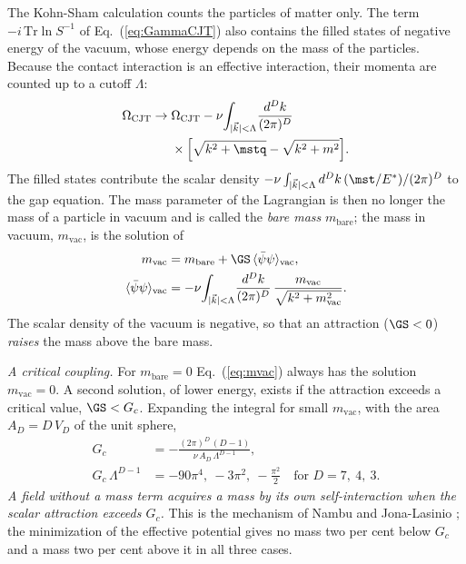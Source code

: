 The Kohn-Sham calculation counts the particles of matter only. The term
$-i\,\mathrm{Tr}\ln S^{-1}$ of Eq.~(\ref{eq:GammaCJT}) also contains the filled states of negative
energy of the vacuum, whose energy depends on the mass of the particles. Because the contact
interaction is an effective interaction, their momenta are counted up to a cutoff $\Lambda$:
\begin{equation}
\begin{aligned}
\Omega_{\mathrm{CJT}}\to{}&\Omega_{\mathrm{CJT}}-\nu\!\int_{|\vec k|<\Lambda}\!\frac{d^{D}k}{(2\pi)^{D}}\\
&\times\Big[\sqrt{k^{2}+\mstq}-\sqrt{k^{2}+m^{2}}\Big].
\end{aligned}
\label{eq:sea}
\end{equation}
The filled states contribute the scalar density
$-\nu\int_{|\vec k|<\Lambda}d^{D}k\,(\mst/E^{*})/(2\pi)^{D}$ to the gap equation. The mass parameter
of the Lagrangian is then no longer the mass of a particle in vacuum and is called the \emph{bare
mass} $m_{\mathrm{bare}}$; the mass in vacuum, $m_{\mathrm{vac}}$, is the solution of
\begin{equation}
\begin{aligned}
m_{\mathrm{vac}}&=m_{\mathrm{bare}}+\GS\,\langle\bar\psi\psi\rangle_{\mathrm{vac}},\\
\langle\bar\psi\psi\rangle_{\mathrm{vac}}&=-\nu\!\int_{|\vec k|<\Lambda}\!\frac{d^{D}k}{(2\pi)^{D}}\,\frac{m_{\mathrm{vac}}}{\sqrt{k^{2}+m_{\mathrm{vac}}^{2}}} .
\end{aligned}
\label{eq:mvac}
\end{equation}
The scalar density of the vacuum is negative, so that an attraction ($\GS<0$) \emph{raises} the mass
above the bare mass.

\emph{A critical coupling.} For $m_{\mathrm{bare}}=0$ Eq.~(\ref{eq:mvac}) always has the solution
$m_{\mathrm{vac}}=0$. A second solution, of lower energy, exists if the attraction exceeds a
critical value, $\GS<G_c$. Expanding the integral for small $m_{\mathrm{vac}}$, with the area
$A_D=D\,V_D$ of the unit sphere,
\begin{equation}
\begin{aligned}
G_c&=-\frac{(2\pi)^{D}\,(D-1)}{\nu\,A_D\,\Lambda^{D-1}},\\
G_c\,\Lambda^{D-1}&=-90\pi^{4},\ -3\pi^{2},\ -\frac{\pi^{2}}{2}\quad\text{for }D=7,\ 4,\ 3 .
\end{aligned}
\label{eq:Gc}
\end{equation}
\emph{A field without a mass term acquires a mass by its own self-interaction when the scalar
attraction exceeds $G_c$.} This is the mechanism of Nambu and Jona-Lasinio \cite{NJL1961};
the minimization of the effective potential gives no mass two per cent below $G_c$ and a mass two
per cent above it in all three cases.

